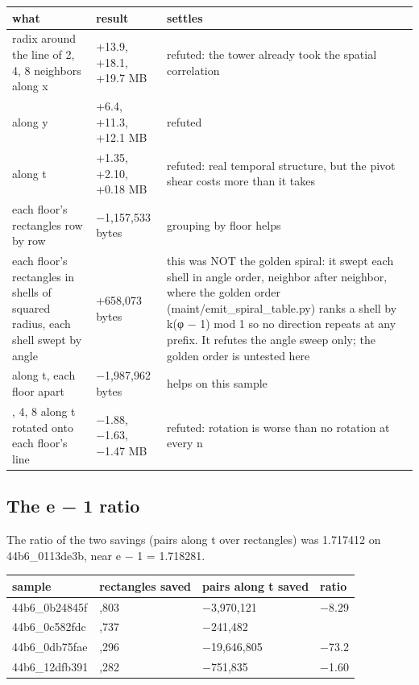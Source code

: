 {\small
\setlength{\tabcolsep}{6pt}
\begin{longtable}{>{\RaggedRight\arraybackslash}p{}>{\RaggedRight\arraybackslash}p{}>{\RaggedRight\arraybackslash}p{}}
\toprule
what & result & settles \\
\midrule
\endhead
radix around the line of 2, 4, 8 neighbors along x & +13.9, +18.1, +19.7 MB & refuted: the tower already took the spatial correlation \\
along y & +6.4, +11.3, +12.1 MB & refuted \\
along t & +1.35, +2.10, +0.18 MB & refuted: real temporal structure, but the pivot shear costs more than it takes \\
each floor's rectangles row by row & −1,157,533 bytes & grouping by floor helps \\
each floor's rectangles in shells of squared radius, each shell swept by angle & +658,073 bytes & this was NOT the golden spiral: it swept each shell in angle order, neighbor after neighbor, where the golden order (maint/emit\_\allowbreak{}spiral\_\allowbreak{}table.py) ranks a shell by k(φ − 1) mod 1 so no direction repeats at any prefix. It refutes the angle sweep only; the golden order is untested here \\
2 along t, each floor apart & −1,987,962 bytes & helps on this sample \\
2, 4, 8 along t rotated onto each floor's line & −1.88, −1.63, −1.47 MB & refuted: rotation is worse than no rotation at every n \\
\bottomrule
\end{longtable}
}

\subsection{\texorpdfstring{The e − 1 ratio}{The e − 1 ratio}}

The ratio of the two savings (pairs along t over rectangles) was 1.717412 on 44b6\_\allowbreak{}0113de3b, near e − 1 = 1.718281.

{\footnotesize
\setlength{\tabcolsep}{6pt}
\begin{longtable}{>{\RaggedRight\arraybackslash}p{}>{\RaggedRight\arraybackslash}p{}>{\RaggedRight\arraybackslash}p{}>{\RaggedRight\arraybackslash}p{}}
\toprule
sample & rectangles saved & pairs along t saved & ratio \\
\midrule
\endhead
44b6\_\allowbreak{}0b24845f & 478,803 & −3,970,121 & −8.29 \\
44b6\_\allowbreak{}0c582fdc & 552,737 & −241,482 & 0.44 \\
44b6\_\allowbreak{}0db75fae & 268,296 & −19,646,805 & −73.2 \\
44b6\_\allowbreak{}12dfb391 & 469,282 & −751,835 & −1.60 \\
\bottomrule
\end{longtable}
}

